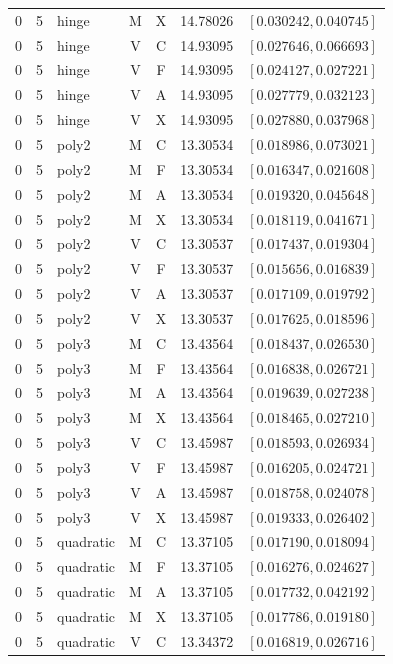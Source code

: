 \begin{longtable}{r r l c c r l}
0 & 5 & hinge & M & X & 14.78026 & $[0.030242,0.040745]$ \\
0 & 5 & hinge & V & C & 14.93095 & $[0.027646,0.066693]$ \\
0 & 5 & hinge & V & F & 14.93095 & $[0.024127,0.027221]$ \\
0 & 5 & hinge & V & A & 14.93095 & $[0.027779,0.032123]$ \\
0 & 5 & hinge & V & X & 14.93095 & $[0.027880,0.037968]$ \\
0 & 5 & poly2 & M & C & 13.30534 & $[0.018986,0.073021]$ \\
0 & 5 & poly2 & M & F & 13.30534 & $[0.016347,0.021608]$ \\
0 & 5 & poly2 & M & A & 13.30534 & $[0.019320,0.045648]$ \\
0 & 5 & poly2 & M & X & 13.30534 & $[0.018119,0.041671]$ \\
0 & 5 & poly2 & V & C & 13.30537 & $[0.017437,0.019304]$ \\
0 & 5 & poly2 & V & F & 13.30537 & $[0.015656,0.016839]$ \\
0 & 5 & poly2 & V & A & 13.30537 & $[0.017109,0.019792]$ \\
0 & 5 & poly2 & V & X & 13.30537 & $[0.017625,0.018596]$ \\
0 & 5 & poly3 & M & C & 13.43564 & $[0.018437,0.026530]$ \\
0 & 5 & poly3 & M & F & 13.43564 & $[0.016838,0.026721]$ \\
0 & 5 & poly3 & M & A & 13.43564 & $[0.019639,0.027238]$ \\
0 & 5 & poly3 & M & X & 13.43564 & $[0.018465,0.027210]$ \\
0 & 5 & poly3 & V & C & 13.45987 & $[0.018593,0.026934]$ \\
0 & 5 & poly3 & V & F & 13.45987 & $[0.016205,0.024721]$ \\
0 & 5 & poly3 & V & A & 13.45987 & $[0.018758,0.024078]$ \\
0 & 5 & poly3 & V & X & 13.45987 & $[0.019333,0.026402]$ \\
0 & 5 & quadratic & M & C & 13.37105 & $[0.017190,0.018094]$ \\
0 & 5 & quadratic & M & F & 13.37105 & $[0.016276,0.024627]$ \\
0 & 5 & quadratic & M & A & 13.37105 & $[0.017732,0.042192]$ \\
0 & 5 & quadratic & M & X & 13.37105 & $[0.017786,0.019180]$ \\
0 & 5 & quadratic & V & C & 13.34372 & $[0.016819,0.026716]$ \\

\end{longtable}
